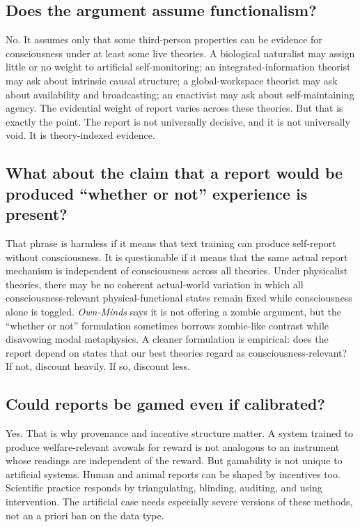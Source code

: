 \documentclass[11pt]{article}
\begin{document}
\subsection{Does the argument assume functionalism?}

No. It assumes only that some third-person properties can be evidence for consciousness under at least some live theories. A biological naturalist may assign little or no weight to artificial self-monitoring; an integrated-information theorist may ask about intrinsic causal structure; a global-workspace theorist may ask about availability and broadcasting; an enactivist may ask about self-maintaining agency. The evidential weight of report varies across these theories. But that is exactly the point. The report is not universally decisive, and it is not universally void. It is theory-indexed evidence.

\subsection{What about the claim that a report would be produced ``whether or not'' experience is present?}

That phrase is harmless if it means that text training can produce self-report without consciousness. It is questionable if it means that the same actual report mechanism is independent of consciousness across all theories. Under physicalist theories, there may be no coherent actual-world variation in which all consciousness-relevant physical-functional states remain fixed while consciousness alone is toggled. \textit{Own-Minds} says it is not offering a zombie argument, but the ``whether or not'' formulation sometimes borrows zombie-like contrast while disavowing modal metaphysics. A cleaner formulation is empirical: does the report depend on states that our best theories regard as consciousness-relevant? If not, discount heavily. If so, discount less.

\subsection{Could reports be gamed even if calibrated?}

Yes. That is why provenance and incentive structure matter. A system trained to produce welfare-relevant avowals for reward is not analogous to an instrument whose readings are independent of the reward. But gamability is not unique to artificial systems. Human and animal reports can be shaped by incentives too. Scientific practice responds by triangulating, blinding, auditing, and using intervention. The artificial case needs especially severe versions of these methods, not an a priori ban on the data type.
\end{document}

